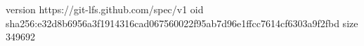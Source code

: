 version https://git-lfs.github.com/spec/v1
oid sha256:e32d8b6956a3f1914316cad067560022f95ab7d96e1ffcc7614cf6303a9f2fbd
size 349692
